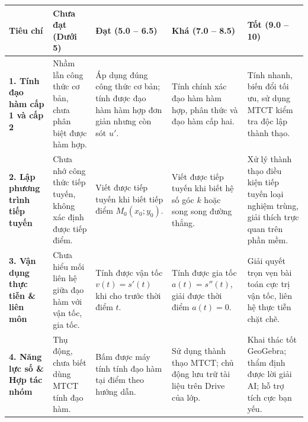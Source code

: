 \documentclass[12pt, a4paper]{article}
\begin{document}
\begin{center}
\begin{tabularx}{\textwidth}{|p{3cm}|X|X|X|X|}
\hline
\textbf{Tiêu chí} & \textbf{Chưa đạt (Dưới 5)} & \textbf{Đạt (5.0 -- 6.5)} & \textbf{Khá (7.0 -- 8.5)} & \textbf{Tốt (9.0 -- 10)} \\
\hline
\textbf{1. Tính đạo hàm cấp 1 và cấp 2} & Nhầm lẫn công thức cơ bản, chưa phân biệt được hàm hợp. & Áp dụng đúng công thức cơ bản; tính được đạo hàm hàm hợp đơn giản nhưng còn sót $u'$. & Tính chính xác đạo hàm hàm hợp, phân thức và đạo hàm cấp hai. & Tính nhanh, biến đổi tối ưu, sử dụng MTCT kiểm tra độc lập thành thạo. \\
\hline
\textbf{2. Lập phương trình tiếp tuyến} & Chưa nhớ công thức tiếp tuyến, không xác định được tiếp điểm. & Viết được tiếp tuyến khi biết tiếp điểm $M_0(x_0; y_0)$. & Viết được tiếp tuyến khi biết hệ số góc $k$ hoặc song song đường thẳng. & Xử lý thành thạo điều kiện tiếp tuyến loại nghiệm trùng, giải thích trực quan trên phần mềm. \\
\hline
\textbf{3. Vận dụng thực tiễn \& liên môn} & Chưa hiểu mối liên hệ giữa đạo hàm với vận tốc, gia tốc. & Tính được vận tốc $v(t) = s'(t)$ khi cho trước thời điểm $t$. & Tính được gia tốc $a(t) = s''(t)$, giải được thời điểm $a(t) = 0$. & Giải quyết trọn vẹn bài toán cực trị vận tốc, liên hệ thực tiễn chặt chẽ. \\
\hline
\textbf{4. Năng lực số \& Hợp tác nhóm} & Thụ động, chưa biết dùng MTCT tính đạo hàm. & Bấm được máy tính tính đạo hàm tại điểm theo hướng dẫn. & Sử dụng thành thạo MTCT; chủ động lưu trữ tài liệu trên Drive của lớp. & Khai thác tốt GeoGebra; thẩm định được lời giải AI; hỗ trợ tích cực bạn yếu. \\
\hline
\end{tabularx}
\end{center}
\end{document}
